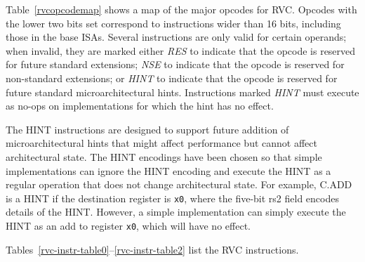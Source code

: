 Table~\ref{rvcopcodemap} shows a map of the major opcodes for RVC.
Opcodes with the lower two bits set correspond to instructions wider
than 16 bits, including those in the base ISAs.  Several instructions
are only valid for certain operands; when invalid, they are marked
either {\em RES} to indicate that the opcode is reserved for future
standard extensions; {\em NSE} to indicate that the opcode is reserved
for non-standard extensions; or {\em HINT} to indicate that the opcode
is reserved for future standard microarchitectural hints.
Instructions marked {\em HINT} must execute as no-ops on
implementations for which the hint has no effect.

\begin{commentary}
The HINT instructions are designed to support future addition of
microarchitectural hints that might affect performance but cannot
affect architectural state.  The HINT encodings have been chosen so
that simple implementations can ignore the HINT encoding and execute
the HINT as a regular operation that does not change architectural
state.  For example, C.ADD is a HINT if the destination register is
{\tt x0}, where the five-bit rs2 field encodes details of the HINT.
However, a simple implementation can simply execute the HINT as an add
to register {\tt x0}, which will have no effect.
\end{commentary}



Tables~\ref{rvc-instr-table0}--\ref{rvc-instr-table2} list the RVC instructions.

